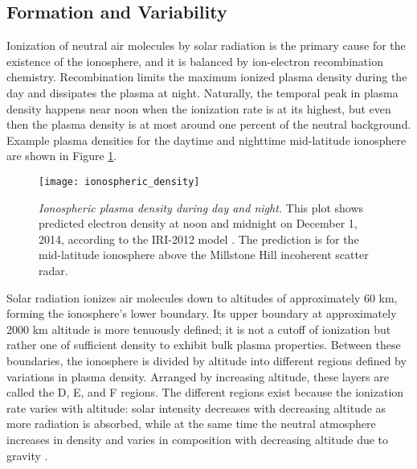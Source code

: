 \subsection{Formation and Variability}
\label{intro_ionosphere_formation}
Ionization of neutral air molecules by solar radiation is the primary cause for the existence of the ionosphere, and it is balanced by ion-electron recombination chemistry. Recombination limits the maximum ionized plasma density during the day and dissipates the plasma at night. Naturally, the temporal peak in plasma density happens near noon when the ionization rate is at its highest, but even then the plasma density is at most around one percent of the neutral background. Example plasma densities for the daytime and nighttime mid-latitude ionosphere are shown in Figure \ref{fig:ionospheric_density}.
\begin{figure}[tpb]
 \centering
 \texttt{[image: ionospheric\_density]}
 \caption[Ionospheric plasma density during day and night]{\emph{Ionospheric plasma density during day and night.} This plot shows predicted electron density at noon and midnight on December 1, 2014, according to the IRI-2012 model \autocite{BAZ+14}. The prediction is for the mid-latitude ionosphere above the Millstone Hill incoherent scatter radar.}
 \label{fig:ionospheric_density}
\end{figure}%
Solar radiation ionizes air molecules down to altitudes of approximately 60 km, forming the ionosphere's lower boundary. Its upper boundary at approximately 2000 km altitude is more tenuously defined; it is not a cutoff of ionization but rather one of sufficient density to exhibit bulk plasma properties. Between these boundaries, the ionosphere is divided by altitude into different regions defined by variations in plasma density. Arranged by increasing altitude, these layers are called the D, E, and F regions. The different regions exist because the ionization rate varies with altitude: solar intensity decreases with decreasing altitude as more radiation is absorbed, while at the same time the neutral atmosphere increases in density and varies in composition with decreasing altitude due to gravity \autocite{Tas10, Kel09}.

